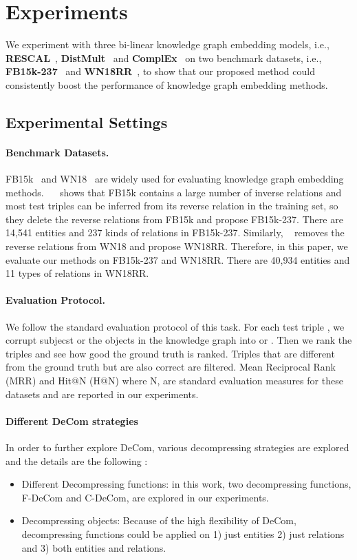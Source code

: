 \documentclass[letterpaper]{article} \usepackage{aaai20}  \usepackage{times}  \usepackage{helvet} \usepackage{courier}  \usepackage{booktabs}
\begin{document}
\section{Experiments}
We experiment with three bi-linear knowledge graph embedding models, i.e., \textbf{RESCAL}~\cite{nickel2011three}, \textbf{DistMult}~\cite{yang2014embedding} and \textbf{ComplEx}~\cite{trouillon2016complex} on two benchmark datasets, i.e., \textbf{FB15k-237}~\cite{toutanova2015observed} and \textbf{WN18RR}~\cite{dettmers2018convolutional}, to show that our proposed method could consistently boost the performance of knowledge graph embedding methods.
\subsection{Experimental Settings}
\paragraph{Benchmark Datasets.}
FB15k~\cite{bordes2013translating} and WN18~\cite{bordes2013translating} are widely used for evaluating knowledge graph embedding methods. ~\citeauthor{toutanova2015observed}~ shows that FB15k contains a large number of inverse relations and most test triples can be inferred from its reverse relation in the training set, so they delete the reverse relations from FB15k and propose FB15k-237. There are 14,541 entities and 237 kinds of relations in FB15k-237. Similarly, \citeauthor{dettmers2018convolutional}~ removes the reverse relations from WN18 and propose WN18RR. Therefore, in this paper, we evaluate our methods on FB15k-237 and WN18RR. There are 40,934 entities and 11 types of relations in WN18RR.
\paragraph{Evaluation Protocol.} We follow the standard evaluation protocol of this task. For each test triple , we corrupt subjecst or the objects in the knowledge graph into  or . Then we rank the triples and see how good the ground truth is ranked. Triples that are different from the ground truth but are also correct are filtered.
Mean Reciprocal Rank (MRR) and Hit@N (H@N) where N, are standard evaluation measures
for these datasets and are reported in our experiments.
\paragraph{Different DeCom strategies}
In order to further explore DeCom, various decompressing strategies are explored and the details are the following :
\begin{itemize}
    \item Different Decompressing functions: in this work, two decompressing functions, F-DeCom and C-DeCom, are explored in our experiments.
    \item Decompressing objects: Because of the high flexibility of DeCom, decompressing functions could be applied on 1) just entities 2) just relations and 3) both entities and relations.
\end{itemize}
\end{document}
